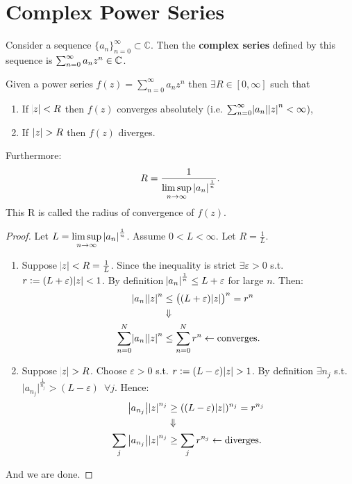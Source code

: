 \setcounter{section}{0}
\setcounter{theorem}{0}

\section{Complex Power Series}

\begin{definition}
Consider a sequence $\{a_n\}_{n=0}^\infty \subset \mathbb{C}$. Then the \textbf{complex series} defined by this sequence is $\sum_{n=0}^\infty a_nz^n \in \mathbb{C}$.
\end{definition}

\begin{proposition}
Given a power series $f(z)=\sum_{n=0}^\infty a_nz^n$ then $\exists R \in [0,\infty]$ such that
\begin{enumerate}
    \item If $\abs{z}<R$ then $f(z)$ converges absolutely (i.e. $\sum_{n=0}^\infty \abs{a_n}\abs{z}^n < \infty$),
    \item If $\,\abs{z}>R$ then $f(z)$ diverges.
\end{enumerate}
Furthermore:
\begin{align*}
    R=\frac{1}{\limsup\limits_{n\rightarrow \infty} \, \abs{a_n}^\frac{1}{n}}.
\end{align*}
This R is called the radius of convergence of $f(z)$.
\end{proposition}

\begin{proof}
Let $L=\limsup\limits_{n\rightarrow \infty} \, \abs{a_n}^\frac{1}{n}$. Assume $0<L<\infty$. Let $R=\frac{1}{L}$.
\begin{enumerate}
    \item Suppose $\abs{z}<R=\frac{1}{L}$. Since the inequality is strict $\exists \varepsilon>0$ s.t. $r\vcentcolon=(L+\varepsilon)\abs{z}<1$. By definition $\abs{a_n}^\frac{1}{n}\leq L+\varepsilon$ for large $n$. Then:
    \begin{align*}
        \abs{a_n} \abs{z}^n &\leq \left( \left( L+\varepsilon \right)\abs{z} \right)^n = r^n\\
        &\Downarrow\\
        \sum_{n=0}^N \abs{a_n}\abs{z}^n &\leq \sum_{n=0}^N r^n \leftarrow \text{converges}.
    \end{align*}
    \item Suppose $\abs{z}>R$. Choose $\varepsilon>0$ s.t. $r\vcentcolon=(L-\varepsilon)\abs{z}>1$. By definition $\exists n_j$ s.t. $\big|a_{n_j}\big|^\frac{1}{n_j}> (L-\varepsilon) \,\,\, \forall j$. Hence: 
    \begin{align*}
        \big|a_{n_j}\big|\abs{z}^{n_j} &\geq ((L-\varepsilon)\abs{z})^{n_j} = r^{n_j}\\
        &\Downarrow\\
        \sum_j \big|a_{n_j}\big|\abs{z}^{n_j} &\geq \sum_j r^{n_j} \leftarrow \text{diverges}.
    \end{align*}
\end{enumerate}
And we are done.
\end{proof}

